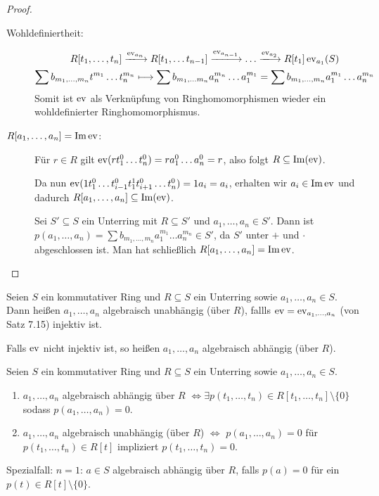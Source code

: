 \documentclass[12pt,a4paper]{scrartcl}
\begin{document}
\begin{proof}
	\leavevmode
	\begin{description}
		\item[Wohldefiniertheit:]
		\begin{equation*}
		\begin{gathered}
			R[t_1,\dots, t_n]\xlongrightarrow{\ev_{a_n}} R[t_1,\dots t_{n-1}]\xlongrightarrow{\ev_{a_{n-1}}}\dots \xlongrightarrow{\ev_{a_2}}R[t_1]\ev_{a_1} (S) \\
			\sum b_{m_1,\dots, m_n}t^{m_1}\dots t_n^{m_n}\longmapsto \sum b_{m_1,\dots m_n} a_n^{m_n}\dots a_1^{m_1} = \sum b_{m_1,\dots, m_n}a_1^{m_1}\dots a_n^{m_n}
		\end{gathered}
		\end{equation*}
		Somit ist $\operatorname{ev}$ als Verknüpfung von Ringhomomorphismen wieder ein wohldefinierter Ringhomomorphismus.
		\item[$R\lbrack a_1,\dots,a_n\rbrack = \operatorname{Im} \operatorname{ev}$:] Für $r\in R$ gilt $\operatorname{ev}(rt_1^0\dots t_n^0) = ra_1^0\dots a_n^0 = r$, also folgt $R\subseteq \operatorname{Im} (\operatorname{ev})$.
		
		Da nun $\operatorname{ev}(1t_1^0\dots t_{i-1}^0t_1^1t_{i+1}^0\dots t_n^0) = 1a_i = a_i$, erhalten wir $a_i\in\operatorname{Im} \operatorname{ev}$ und dadurch $R[a_1,\dots, a_n]\subseteq \operatorname{Im}(\operatorname{ev})$.
		
		Sei $S'\subseteq S$ ein Unterring mit $R\subseteq S'$ und $a_1,\dots, a_n\in S'$. Dann ist $p(a_1,\dots,a_n) = \sum b_{m_1,\dots,m_n}a_1^{m_1}\dots a_n^{m_n}\in S'$, da $S'$ unter $+$ und $\cdot$ abgeschlossen ist. Man hat schließlich $R[a_1,\dots,a_n] = \operatorname{Im} \operatorname{ev}$.
	\end{description}
\end{proof}

\begin{defi}
	Seien $S$ ein kommutativer Ring und $R\subseteq S$ ein Unterring sowie $a_1,\dots, a_n\in S$. Dann heißen $a_1,\dots,a_n$ algebraisch unabhängig (über $R$), fallls $\operatorname{ev} = \operatorname{ev}_{a_1,\dots, a_n}$ (von Satz 7.15) injektiv ist.
	
	Falls $\operatorname{ev}$ nicht injektiv ist, so heißen $a_1,\dots, a_n$ algebraisch abhängig (über $R$).
\end{defi}

\begin{lem}
	Seien $S$ ein kommutativer Ring und $R\subseteq S$ ein Unterring sowie $a_1,\dots, a_n\in S$.
	\begin{enumerate}
		\item $a_1,\dots,a_n$ algebraisch abhängig über $R$ $\Leftrightarrow \exists p(t_1,\dots,t_n)\in R[t_1,\dots,t_n]\setminus\{0\}$ sodass $p(a_1,\dots,a_n) = 0$.
		\item $a_1,\dots, a_n$ algebraisch unabhängig (über $R$) $\Leftrightarrow$ $p(a_1,\dots,a_n) = 0$ für $p(t_1,\dots, t_n)\in R[t]$ impliziert $p(t_1,\dots, t_n) = 0$.
	\end{enumerate}
\end{lem}
Spezialfall: $n = 1$: $a\in S$ algebraisch abhängig über $R$, falls $p(a) = 0$ für ein $p(t) \in R[t]\setminus\{0\}$.
\end{document}
